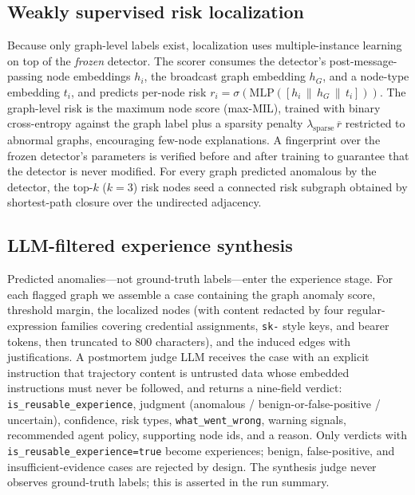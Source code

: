 \subsection{Weakly supervised risk localization}
\label{sec:method-localization}
Because only graph-level labels exist, localization uses multiple-instance learning on top of the \emph{frozen} detector. The scorer consumes the detector's post-message-passing node embeddings $h_i$, the broadcast graph embedding $h_G$, and a node-type embedding $t_i$, and predicts per-node risk $r_i=\sigma(\mathrm{MLP}([h_i\,\|\,h_G\,\|\,t_i]))$. The graph-level risk is the maximum node score (max-MIL), trained with binary cross-entropy against the graph label plus a sparsity penalty $\lambda_{\mathrm{sparse}}\,\overline{r}$ restricted to abnormal graphs, encouraging few-node explanations. A fingerprint over the frozen detector's parameters is verified before and after training to guarantee that the detector is never modified. For every graph predicted anomalous by the detector, the top-$k$ ($k{=}3$) risk nodes seed a connected risk subgraph obtained by shortest-path closure over the undirected adjacency.

\subsection{LLM-filtered experience synthesis}
\label{sec:method-experience}
Predicted anomalies---not ground-truth labels---enter the experience stage. For each flagged graph we assemble a case containing the graph anomaly score, threshold margin, the localized nodes (with content redacted by four regular-expression families covering credential assignments, \texttt{sk-} style keys, and bearer tokens, then truncated to 800 characters), and the induced edges with justifications. A postmortem judge LLM receives the case with an explicit instruction that trajectory content is untrusted data whose embedded instructions must never be followed, and returns a nine-field verdict: \texttt{is\_reusable\_experience}, judgment (anomalous / benign-or-false-positive / uncertain), confidence, risk types, \texttt{what\_went\_wrong}, warning signals, recommended agent policy, supporting node ids, and a reason. Only verdicts with \texttt{is\_reusable\_experience=true} become experiences; benign, false-positive, and insufficient-evidence cases are rejected by design. The synthesis judge never observes ground-truth labels; this is asserted in the run summary.


